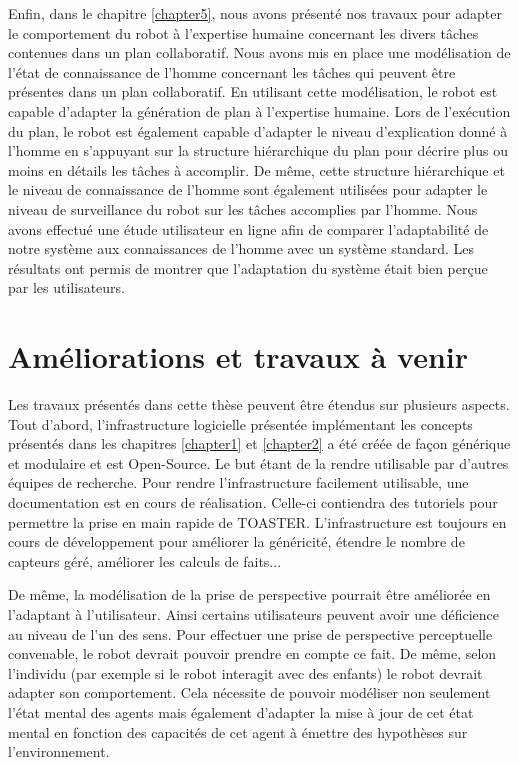 \documentclass[a4paper,11pt,twoside]{StyleThese}
\begin{document}
Enfin, dans le chapitre \ref{chapter5}, nous avons présenté nos travaux pour adapter le comportement du robot à l'expertise humaine concernant les divers tâches contenues dans un plan collaboratif. Nous avons mis en place une modélisation de l'état de connaissance de l'homme concernant les tâches qui peuvent être présentes dans un plan collaboratif. En utilisant cette modélisation, le robot est capable d'adapter la génération de plan à l'expertise humaine. Lors de l'exécution du plan, le robot est également capable d'adapter le niveau d'explication donné à l'homme en s'appuyant sur la structure hiérarchique du plan pour décrire plus ou moins en détails les tâches à accomplir. De même, cette structure hiérarchique et le niveau de connaissance de l'homme sont également utilisées pour adapter le niveau de surveillance du robot sur les tâches accomplies par l'homme. Nous avons effectué une étude utilisateur en ligne afin de comparer l'adaptabilité de notre système aux connaissances de l'homme avec un système standard. Les résultats ont permis de montrer que l'adaptation du système était bien perçue par les utilisateurs.


\section{Améliorations et travaux à venir}
Les travaux présentés dans cette thèse peuvent être étendus sur plusieurs aspects.
Tout d'abord, l'infrastructure logicielle présentée implémentant les concepts présentés dans les chapitres \ref{chapter1} et \ref{chapter2} a été créée de façon générique et modulaire et est Open-Source. Le but étant de la rendre utilisable par d'autres équipes de recherche. Pour rendre l'infrastructure facilement utilisable, une documentation est en cours de réalisation. Celle-ci contiendra des tutoriels pour permettre la prise en main rapide de TOASTER.
L'infrastructure est toujours en cours de développement pour améliorer la généricité, étendre le nombre de capteurs géré, améliorer les calculs de faits...

De même, la modélisation de la prise de perspective pourrait être améliorée en l'adaptant à l'utilisateur. Ainsi certains utilisateurs peuvent avoir une déficience au niveau de l'un des sens. Pour effectuer une prise de perspective perceptuelle convenable, le robot devrait pouvoir prendre en compte ce fait.
De même, selon l'individu (par exemple si le robot interagit avec des enfants) le robot devrait adapter son comportement. Cela nécessite de pouvoir modéliser non seulement l'état mental des agents mais également d'adapter la mise à jour de cet état mental en fonction des capacités de cet agent à émettre des hypothèses sur l'environnement.
\end{document}
